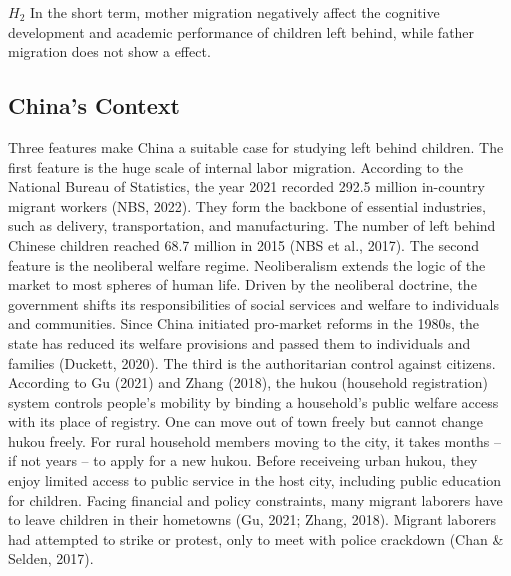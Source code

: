 \documentclass[
  man,floatsintext]{apa7}
\begin{document}
\(H_2\) In the short term, mother migration negatively affect the cognitive development and academic performance of children left behind, while father migration does not show a effect.

\hypertarget{chinas-context}{%
\subsection{China's Context}\label{chinas-context}}

Three features make China a suitable case for studying left behind children. The first feature is the huge scale of internal labor migration. According to the National Bureau of Statistics, the year 2021 recorded 292.5 million in-country migrant workers (NBS, 2022). They form the backbone of essential industries, such as delivery, transportation, and manufacturing. The number of left behind Chinese children reached 68.7 million in 2015 (NBS et al., 2017). The second feature is the neoliberal welfare regime. Neoliberalism extends the logic of the market to most spheres of human life. Driven by the neoliberal doctrine, the government shifts its responsibilities of social services and welfare to individuals and communities. Since China initiated pro-market reforms in the 1980s, the state has reduced its welfare provisions and passed them to individuals and families (Duckett, 2020). The third is the authoritarian control against citizens. According to Gu (2021) and Zhang (2018), the hukou (household registration) system controls people's mobility by binding a household's public welfare access with its place of registry. One can move out of town freely but cannot change hukou freely. For rural household members moving to the city, it takes months -- if not years -- to apply for a new hukou. Before receiveing urban hukou, they enjoy limited access to public service in the host city, including public education for children. Facing financial and policy constraints, many migrant laborers have to leave children in their hometowns (Gu, 2021; Zhang, 2018). Migrant laborers had attempted to strike or protest, only to meet with police crackdown (Chan \& Selden, 2017).
\end{document}
